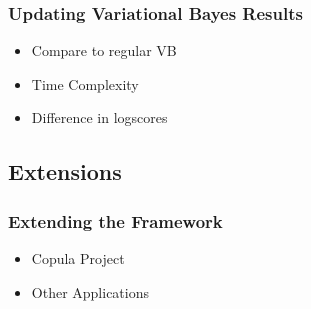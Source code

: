 \documentclass[8pt]{beamer}\usepackage[]{graphicx}\usepackage[]{color}
\begin{document}
\begin{frame}
\frametitle{Updating Variational Bayes Results}
\begin{itemize}
\item Compare to regular VB
\item Time Complexity
\item Difference in logscores
\end{itemize}
\end{frame}

\begin{frame}
\section{Extensions}
\frametitle{Extending the Framework}
\begin{itemize}
\item Copula Project
\item Other Applications
\end{itemize}
\end{frame}
\end{document}
